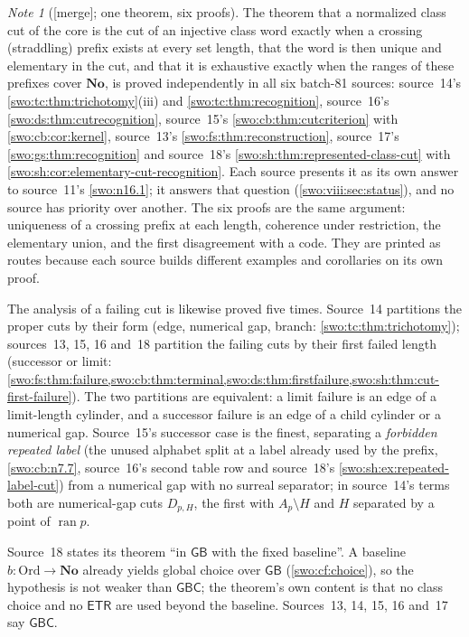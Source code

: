 \documentclass[11pt]{article}
\theoremstyle{definition}
\theoremstyle{remark}
\newtheorem{note}[note]{Note}
\newcommand{\No}{\mathbf{No}}
\newcommand{\Ord}{\mathrm{Ord}}
\newcommand{\ran}{\operatorname{ran}}
\newcommand{\GB}{\mathsf{GB}}
\newcommand{\GBC}{\mathsf{GBC}}
\newcommand{\ETR}{\mathsf{ETR}}
\newcommand{\merge}{\textsf{[merge]}}
\begin{document}
\begin{note}[\merge; one theorem, six proofs]\label{swo:viii:note:sixfold}
The theorem that a normalized class cut of the core is the cut of an
injective class word exactly when a crossing (straddling) prefix exists at
every set length, that the word is then unique and elementary in the cut,
and that it is exhaustive exactly when the ranges of these prefixes cover
$\No$, is proved independently in all six batch-81 sources:
source~14's \cref{swo:tc:thm:trichotomy}(iii) and \cref{swo:tc:thm:recognition},
source~16's \cref{swo:ds:thm:cutrecognition}, source~15's
\cref{swo:cb:thm:cutcriterion} with \cref{swo:cb:cor:kernel}, source~13's
\cref{swo:fs:thm:reconstruction}, source~17's \cref{swo:gs:thm:recognition}
and source~18's \cref{swo:sh:thm:represented-class-cut} with
\cref{swo:sh:cor:elementary-cut-recognition}. Each source presents it as its
own answer to source~11's \cref{swo:n16.1}; it answers that question
(\cref{swo:viii:sec:status}), and no source has priority over another. The
six proofs are the same argument: uniqueness of a crossing prefix at each
length, coherence under restriction, the elementary union, and the first
disagreement with a code. They are printed as routes because each source
builds different examples and corollaries on its own proof.

The analysis of a failing cut is likewise proved five times. Source~14
partitions the proper cuts by their form (edge, numerical gap, branch:
\cref{swo:tc:thm:trichotomy}); sources~13, 15, 16 and~18 partition the
failing cuts by their first failed length (successor or limit:
\cref{swo:fs:thm:failure,swo:cb:thm:terminal,swo:ds:thm:firstfailure,swo:sh:thm:cut-first-failure}).
The two partitions are equivalent: a limit failure is an edge of a
limit-length cylinder, and a successor failure is an edge of a child cylinder
or a numerical gap. Source~15's successor case is the finest, separating a
\emph{forbidden repeated label} (the unused alphabet split at a label already
used by the prefix, \cref{swo:cb:n7.7}, source~16's second table row and
source~18's \cref{swo:sh:ex:repeated-label-cut}) from a numerical gap with no
surreal separator; in source~14's terms both are numerical-gap cuts
$D_{p,H}$, the first with $A_p\setminus H$ and $H$ separated by a point of
$\ran p$.

Source~18 states its theorem ``in $\GB$ with the fixed baseline''. A baseline
$b:\Ord\to\No$ already yields global choice over $\GB$
(\cref{swo:cf:choice}), so the hypothesis is not weaker than $\GBC$; the
theorem's own content is that no class choice and no $\ETR$ are used beyond
the baseline. Sources~13, 14, 15, 16 and~17 say $\GBC$.
\end{note}
\end{document}
